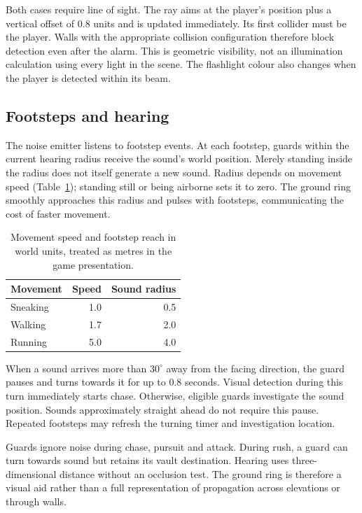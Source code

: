 \documentclass[fleqn,10pt]{SelfArx}
\begin{document}
Both cases require line of sight. The ray aims at the player's position plus a vertical offset of 0.8 units and is updated immediately. Its first collider must be the player. Walls with the appropriate collision configuration therefore block detection even after the alarm. This is geometric visibility, not an illumination calculation using every light in the scene. The flashlight colour also changes when the player is detected within its beam.

\subsection{Footsteps and hearing}
The noise emitter listens to footstep events. At each footstep, guards within the current hearing radius receive the sound's world position. Merely standing inside the radius does not itself generate a new sound. Radius depends on movement speed (Table~\ref{tab:noise}); standing still or being airborne sets it to zero. The ground ring smoothly approaches this radius and pulses with footsteps, communicating the cost of faster movement.

\begin{table}[tb]
\caption{Movement speed and footstep reach in world units, treated as metres in the game presentation.}
\label{tab:noise}
\centering
\begin{tabular}{lrr}
\toprule
Movement & Speed & Sound radius \\
\midrule
Sneaking & 1.0 & 0.5 \\
Walking & 1.7 & 2.0 \\
Running & 5.0 & 4.0 \\
\bottomrule
\end{tabular}
\end{table}

When a sound arrives more than $30^{\circ}$ away from the facing direction, the guard pauses and turns towards it for up to 0.8 seconds. Visual detection during this turn immediately starts chase. Otherwise, eligible guards investigate the sound position. Sounds approximately straight ahead do not require this pause. Repeated footsteps may refresh the turning timer and investigation location.

Guards ignore noise during chase, pursuit and attack. During rush, a guard can turn towards sound but retains its vault destination. Hearing uses three-dimensional distance without an occlusion test. The ground ring is therefore a visual aid rather than a full representation of propagation across elevations or through walls.
\end{document}
